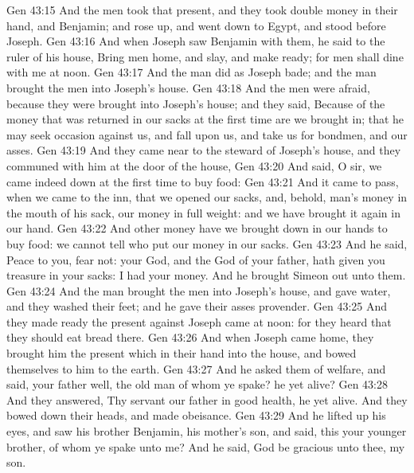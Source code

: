 \vs Gen 43:15 And the men took that present, and they took double money in their hand, and Benjamin; and rose up, and went down to Egypt, and stood before Joseph.
\vs Gen 43:16 And when Joseph saw Benjamin with them, he said to the ruler of his house, Bring  men home, and slay, and make ready; for  men shall dine with me at noon.
\vs Gen 43:17 And the man did as Joseph bade; and the man brought the men into Joseph's house.
\vs Gen 43:18 And the men were afraid, because they were brought into Joseph's house; and they said, Because of the money that was returned in our sacks at the first time are we brought in; that he may seek occasion against us, and fall upon us, and take us for bondmen, and our asses.
\vs Gen 43:19 And they came near to the steward of Joseph's house, and they communed with him at the door of the house,
\vs Gen 43:20 And said, O sir, we came indeed down at the first time to buy food:
\vs Gen 43:21 And it came to pass, when we came to the inn, that we opened our sacks, and, behold,  man's money  in the mouth of his sack, our money in full weight: and we have brought it again in our hand.
\vs Gen 43:22 And other money have we brought down in our hands to buy food: we cannot tell who put our money in our sacks.
\vs Gen 43:23 And he said, Peace  to you, fear not: your God, and the God of your father, hath given you treasure in your sacks: I had your money. And he brought Simeon out unto them.
\vs Gen 43:24 And the man brought the men into Joseph's house, and gave  water, and they washed their feet; and he gave their asses provender.
\vs Gen 43:25 And they made ready the present against Joseph came at noon: for they heard that they should eat bread there.
\vs Gen 43:26 And when Joseph came home, they brought him the present which  in their hand into the house, and bowed themselves to him to the earth.
\vs Gen 43:27 And he asked them of  welfare, and said,  your father well, the old man of whom ye spake?  he yet alive?
\vs Gen 43:28 And they answered, Thy servant our father  in good health, he  yet alive. And they bowed down their heads, and made obeisance.
\vs Gen 43:29 And he lifted up his eyes, and saw his brother Benjamin, his mother's son, and said,  this your younger brother, of whom ye spake unto me? And he said, God be gracious unto thee, my son.
